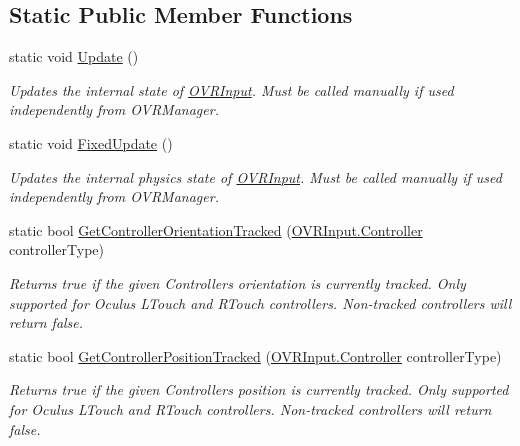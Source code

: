 \subsection*{Static Public Member Functions}
\begin{DoxyCompactItemize}
\item 
static void \mbox{\hyperlink{class_o_v_r_input_a6dfa622504b96b15183e4ba1b2e91575}{Update}} ()
\begin{DoxyCompactList}\small\item\em Updates the internal state of \mbox{\hyperlink{class_o_v_r_input}{O\+V\+R\+Input}}. Must be called manually if used independently from O\+V\+R\+Manager. \end{DoxyCompactList}\item 
static void \mbox{\hyperlink{class_o_v_r_input_acd501ed1f3f262609c66c37d784065dc}{Fixed\+Update}} ()
\begin{DoxyCompactList}\small\item\em Updates the internal physics state of \mbox{\hyperlink{class_o_v_r_input}{O\+V\+R\+Input}}. Must be called manually if used independently from O\+V\+R\+Manager. \end{DoxyCompactList}\item 
static bool \mbox{\hyperlink{class_o_v_r_input_adc89b414c04cff08dc0e8fdf469cf02a}{Get\+Controller\+Orientation\+Tracked}} (\mbox{\hyperlink{class_o_v_r_input_a5c86f9052a9cbb0b73779ff5704d60a8}{O\+V\+R\+Input.\+Controller}} controller\+Type)
\begin{DoxyCompactList}\small\item\em Returns true if the given Controller\textquotesingle{}s orientation is currently tracked. Only supported for Oculus L\+Touch and R\+Touch controllers. Non-\/tracked controllers will return false. \end{DoxyCompactList}\item 
static bool \mbox{\hyperlink{class_o_v_r_input_ab99039a8f1f7b5ecc9b6ad137752a305}{Get\+Controller\+Position\+Tracked}} (\mbox{\hyperlink{class_o_v_r_input_a5c86f9052a9cbb0b73779ff5704d60a8}{O\+V\+R\+Input.\+Controller}} controller\+Type)
\begin{DoxyCompactList}\small\item\em Returns true if the given Controller\textquotesingle{}s position is currently tracked. Only supported for Oculus L\+Touch and R\+Touch controllers. Non-\/tracked controllers will return false. \end{DoxyCompactList}\item 

\end{DoxyCompactItemize}
